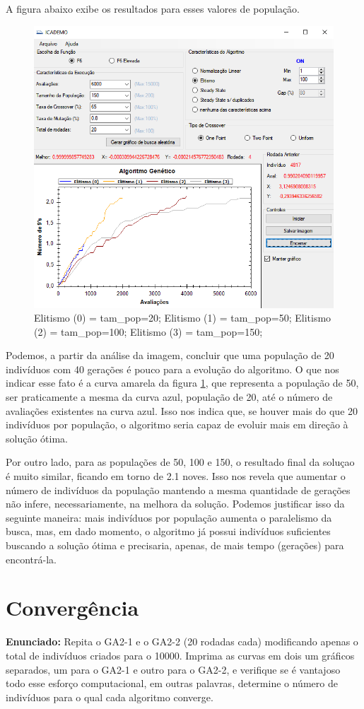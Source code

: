 \documentclass[12pt]{article}
\begin{document}
A figura abaixo exibe os resultados para esses valores de população.

\begin{figure}[H]
	\centering
	\includegraphics[width=0.7\linewidth]{Imagens/questao4}
	\caption{Elitismo (0) = tam\_pop=20; Elitismo (1) = tam\_pop=50; Elitismo (2) = tam\_pop=100; Elitismo (3) = tam\_pop=150;}
	\label{fig:questao4}
\end{figure}

Podemos, a partir da análise da imagem, concluir que uma população de 20 indivíduos com 40 gerações é pouco para a evolução do algoritmo. O que nos indicar esse fato é a curva amarela da figura \ref{fig:questao4}, que representa a população de 50, ser praticamente a mesma da curva azul, população de 20, até o número de avaliações existentes na curva azul. Isso nos indica que, se houver mais do que 20 indivíduos por população, o algoritmo seria capaz de evoluir mais em direção à solução ótima. 

Por outro lado, para as populações de 50, 100 e 150, o resultado final da soluçao é muito similar, ficando em torno de 2.1 noves. Isso nos revela que aumentar o número de indivíduos da população mantendo a mesma quantidade de gerações não infere, necessariamente, na melhora da solução. Podemos justificar isso da seguinte maneira: mais indivíduos por população aumenta o paralelismo da busca, mas, em dado momento, o algoritmo já possui indivíduos suficientes buscando a solução ótima e precisaria, apenas, de mais tempo (gerações) para encontrá-la. 

\section{Convergência}
\textbf{Enunciado:}
Repita o GA2-1 e o GA2-2 (20 rodadas cada) modificando apenas o total de indivíduos criados para o 10000. Imprima as curvas em dois um gráficos separados, um para o GA2-1 e outro para o GA2-2, e verifique se é vantajoso todo esse esforço computacional, em outras palavras, determine o número de
indivíduos para o qual cada algoritmo converge.
\end{document}
